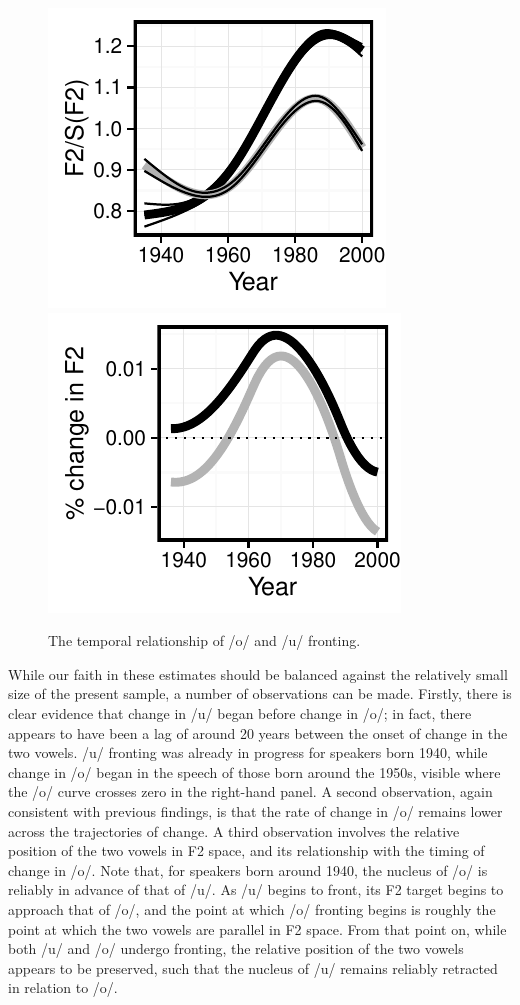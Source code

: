 \documentclass[12pt]{article}
\begin{document}
\begin{figure}
\centering
\includegraphics{owuwparallel.pdf}
\includegraphics{owuwparallelROC.pdf}
\caption{The temporal relationship of /o/ and /u/ fronting.}
\end{figure}

While our faith in these estimates should be balanced against the relatively small size of the present sample, a number of observations can be made. Firstly, there is clear evidence that change in /u/ began before change in /o/; in fact, there appears to have been a lag of around 20 years between the onset of change in the two vowels. /u/ fronting was already in progress for speakers born 1940, while change in /o/ began in the speech of those born around the 1950s, visible where the /o/ curve crosses zero in the right-hand panel. A second observation, again consistent with previous findings, is that the rate of change in /o/ remains lower across the trajectories of change. A third observation involves the relative position of the two vowels in F2 space, and its relationship with the timing of change in /o/. Note that, for speakers born around 1940, the nucleus of /o/ is reliably in advance of that of /u/. As /u/ begins to front, its F2 target begins to approach that of /o/, and the point at which /o/ fronting begins is roughly the point at which the two vowels are parallel in F2 space. From that point on, while both /u/ and /o/ undergo fronting, the relative position of the two vowels appears to be preserved, such that the nucleus of /u/ remains reliably retracted in relation to /o/. 
\end{document}
